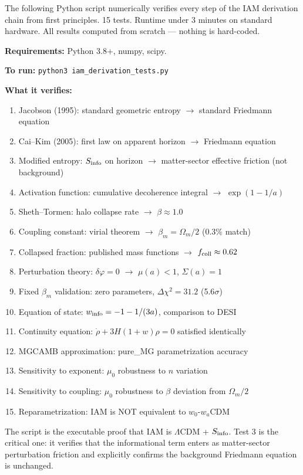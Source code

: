 \documentclass[12pt,a4paper]{article}
\begin{document}
The following Python script numerically verifies every step of the IAM
derivation chain from first principles. 15 tests. Runtime under 3 minutes
on standard hardware. All results computed from scratch --- nothing is
hard-coded.

\textbf{Requirements:} Python 3.8+, numpy, scipy.

\textbf{To run:} \texttt{python3 iam\_derivation\_tests.py}

\textbf{What it verifies:}
\begin{enumerate}
\item Jacobson (1995): standard geometric entropy $\to$ standard Friedmann equation
\item Cai--Kim (2005): first law on apparent horizon $\to$ Friedmann equation
\item Modified entropy: $S_{\rm info}$ on horizon $\to$ matter-sector effective friction (not background)
\item Activation function: cumulative decoherence integral $\to$ $\exp(1-1/a)$
\item Sheth--Tormen: halo collapse rate $\to$ $\beta \approx 1.0$
\item Coupling constant: virial theorem $\to$ $\beta_m = \Omega_m/2$ (0.3\% match)
\item Collapsed fraction: published mass functions $\to$ $f_{\rm coll} \approx 0.62$
\item Perturbation theory: $\delta\varphi = 0$ $\to$ $\mu(a) < 1$, $\Sigma(a) = 1$
\item Fixed $\beta_m$ validation: zero parameters, $\Delta\chi^2 = 31.2$ (5.6$\sigma$)
\item Equation of state: $w_{\rm info} = -1 - 1/(3a)$, comparison to DESI
\item Continuity equation: $\dot\rho + 3H(1+w)\rho = 0$ satisfied identically
\item MGCAMB approximation: pure\_MG parametrization accuracy
\item Sensitivity to exponent: $\mu_0$ robustness to $n$ variation
\item Sensitivity to coupling: $\mu_0$ robustness to $\beta$ deviation from $\Omega_m/2$
\item Reparametrization: IAM is NOT equivalent to $w_0$-$w_a$CDM
\end{enumerate}

The script is the executable proof that IAM is $\Lambda$CDM + $S_{\rm info}$.
Test 3 is the critical one: it verifies that the informational term enters
as matter-sector perturbation friction and explicitly confirms the background
Friedmann equation is unchanged.
\end{document}
